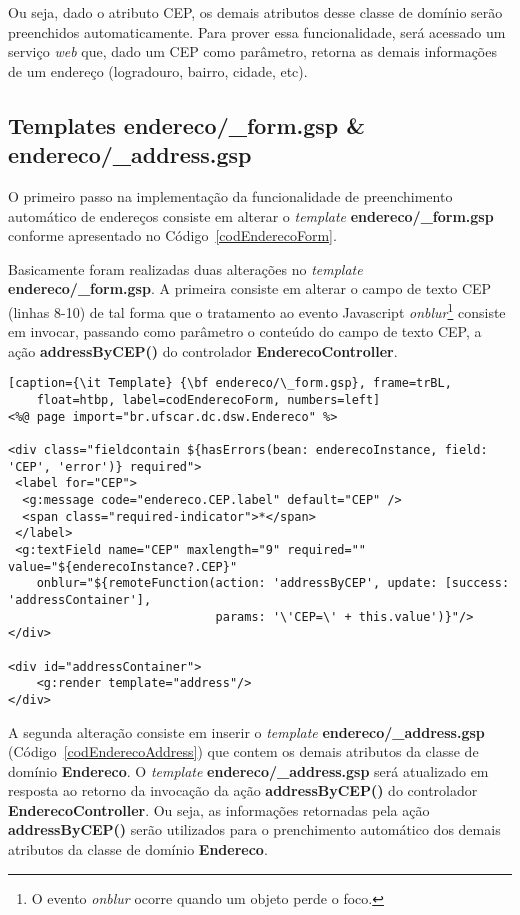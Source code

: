 Ou seja, dado o atributo CEP,  os demais atributos desse classe de domínio serão
preenchidos automaticamente.  Para prover  essa funcionalidade, será acessado um
serviço {\it web} que, dado um CEP como parâmetro, retorna as demais informações
de um endereço (logradouro, bairro, cidade, etc).  

\subsection{Templates endereco/\_form.gsp \& endereco/\_address.gsp}

\vspace{0.5cm}

O primeiro passo na  implementação da funcionalidade de preenchimento automático
de  endereços consiste  em alterar  o {\it  template}  {\bf endereco/\_form.gsp}
conforme apresentado no Código~\ref{codEnderecoForm}.

Basicamente   foram  realizadas   duas   alterações  no   {\it  template}   {\bf
  endereco/\_form.gsp}.  A primeira  consiste em  alterar o  campo de  texto CEP
(linhas  8-10)  de  tal  forma  que  o  tratamento  ao  evento  Javascript  {\it
  onblur}\footnote{O evento {\it onblur} ocorre  quando um objeto perde o foco.}
consiste em invocar, passando como parâmetro o conteúdo do campo de texto CEP, a
ação {\bf addressByCEP()} do controlador {\bf EnderecoController}. 

\begin{lstlisting}[caption={\it Template} {\bf endereco/\_form.gsp}, frame=trBL,
    float=htbp, label=codEnderecoForm, numbers=left] 
<%@ page import="br.ufscar.dc.dsw.Endereco" %>
              
<div class="fieldcontain ${hasErrors(bean: enderecoInstance, field: 'CEP', 'error')} required">
 <label for="CEP">
  <g:message code="endereco.CEP.label" default="CEP" />
  <span class="required-indicator">*</span>
 </label>
 <g:textField name="CEP" maxlength="9" required="" value="${enderecoInstance?.CEP}" 
    onblur="${remoteFunction(action: 'addressByCEP', update: [success: 'addressContainer'],
                             params: '\'CEP=\' + this.value')}"/>
</div>

<div id="addressContainer">
    <g:render template="address"/>
</div>
\end{lstlisting}

A   segunda   alteração   consiste    em   inserir   o   {\it   template}   {\bf
  endereco/\_address.gsp} (Código~\ref{codEnderecoAddress}) que contem os demais
atributos  da  classe  de  domínio   {\bf  Endereco}.   O  {\it  template}  {\bf
  endereco/\_address.gsp} será atualizado em resposta ao retorno da invocação da
ação {\bf addressByCEP()} do  controlador {\bf EnderecoController}.  Ou seja, as
informações retornadas  pela ação {\bf  addressByCEP()} serão utilizados  para o
prenchimento  automático  dos  demais   atributos  da  classe  de  domínio  {\bf
  Endereco}.  

